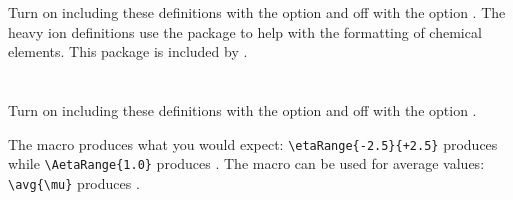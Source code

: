 


\newpage
\section{}

Turn on including these definitions with the option  and off with the option .
The heavy ion definitions use the package  to help with the formatting of chemical elements.
This package is included by .



%


\newpage
\section{}

Turn on including these definitions with the option  and off with the option .



\noindent The macro  produces what you would expect:
\verb|\etaRange{-2.5}{+2.5}| produces  while
\verb|\AetaRange{1.0}| produces .
The macro  can be used for average values:
\verb|\avg{\mu}| produces \avg{\mu}.




% 





% 
